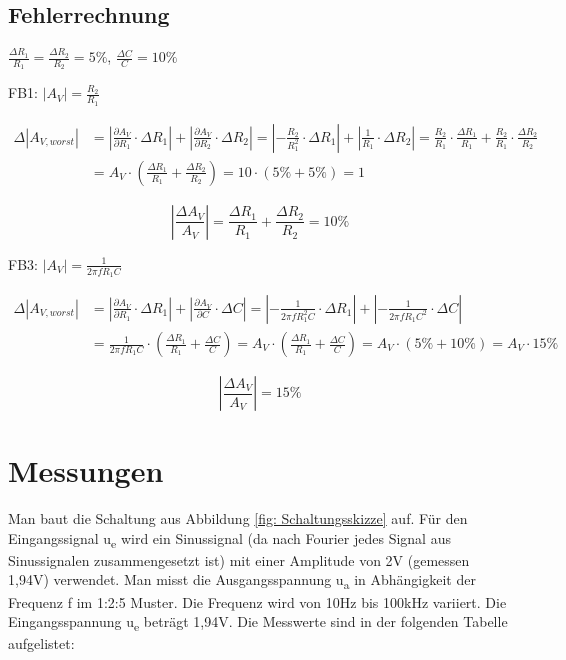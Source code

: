 \subsection{Fehlerrechnung}

$\frac{\Delta R_1}{R_1} = \frac{\Delta R_2}{R_2} = 5\%$, $\frac{\Delta C}{C} = 10\%$ \par

FB1: $|A_V| = \frac{R_2}{R_1}$

\[
    \begin{aligned}
        \Delta |A_{V, worst}| & = |\frac{\partial A_V}{\partial R_1} \cdot \Delta R_1| +
        |\frac{\partial A_V}{\partial R_2} \cdot \Delta R_2| = |- \frac{R_2}{R_1^2} \cdot \Delta R_1|
        + |\frac{1}{R_1} \cdot \Delta R_2| = \frac{R_2}{R_1} \cdot \frac{\Delta R_1}{R_1} + 
        \frac{R_2}{R_1} \cdot \frac{\Delta R_2}{R_2} \\
        & = A_V \cdot (\frac{\Delta R_1}{R_1} + \frac{\Delta R_2}{R_2}) = 
        10 \cdot (5\% + 5\%) = 1
    \end{aligned}
\]

\[
    |\frac{\Delta A_V}{A_V}| = \frac{\Delta R_1}{R_1} + \frac{\Delta R_2}{R_2} = 10\%
\]

FB3: $|A_V| = \frac{1}{2 \pi f R_1 C}$

\[
    \begin{aligned}
        \Delta |A_{V, worst}| & = 
        |\frac{\partial A_V}{\partial R_1} \cdot \Delta R_1| + |\frac{\partial A_V}{\partial C} \cdot \Delta C| 
        = |-\frac{1}{2 \pi f R_1^2 C} \cdot \Delta R_1| +
        |-\frac{1}{2 \pi f R_1 C^2} \cdot \Delta C| \\
        & = \frac{1}{2 \pi f R_1 C} \cdot (\frac{\Delta R_1}{R_1} + \frac{\Delta C}{C}) 
        = A_V \cdot (\frac{\Delta R_1}{R_1} + \frac{\Delta C}{C}) = 
        A_V \cdot (5\% + 10\%) = A_V \cdot 15\%
    \end{aligned}
\]

\[
    |\frac{\Delta A_V}{A_V}| = 15\%
\]

\section{Messungen}
Man baut die Schaltung aus Abbildung \ref{fig: Schaltungsskizze} auf.
Für den Eingangssignal u\textsubscript{e} wird ein Sinussignal
(da nach Fourier jedes Signal aus Sinussignalen zusammengesetzt ist)
mit einer Amplitude von 2V (gemessen 1,94V) verwendet. 
Man misst die Ausgangsspannung u\textsubscript{a} in Abhängigkeit
der Frequenz f im 1:2:5 Muster. Die Frequenz wird von 10Hz bis 
100kHz variiert. Die Eingangsspannung u\textsubscript{e} beträgt
1,94V. Die Messwerte sind in der folgenden Tabelle aufgelistet:

